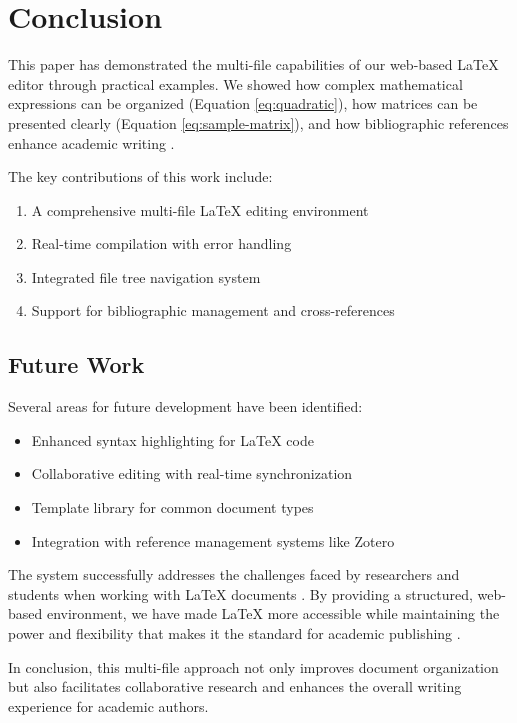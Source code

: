 \section{Conclusion}

This paper has demonstrated the multi-file capabilities of our web-based LaTeX editor through practical examples. We showed how complex mathematical expressions can be organized (Equation \ref{eq:quadratic}), how matrices can be presented clearly (Equation \ref{eq:sample-matrix}), and how bibliographic references enhance academic writing \cite{knuth1984literate}.

The key contributions of this work include:
\begin{enumerate}
    \item A comprehensive multi-file LaTeX editing environment
    \item Real-time compilation with error handling
    \item Integrated file tree navigation system
    \item Support for bibliographic management and cross-references
\end{enumerate}

\subsection{Future Work}

Several areas for future development have been identified:
\begin{itemize}
    \item Enhanced syntax highlighting for LaTeX code
    \item Collaborative editing with real-time synchronization
    \item Template library for common document types
    \item Integration with reference management systems like Zotero
\end{itemize}

The system successfully addresses the challenges faced by researchers and students when working with LaTeX documents \cite{web-based-latex}. By providing a structured, web-based environment, we have made LaTeX more accessible while maintaining the power and flexibility that makes it the standard for academic publishing \cite{lamport1994latex}.

In conclusion, this multi-file approach not only improves document organization but also facilitates collaborative research and enhances the overall writing experience for academic authors.